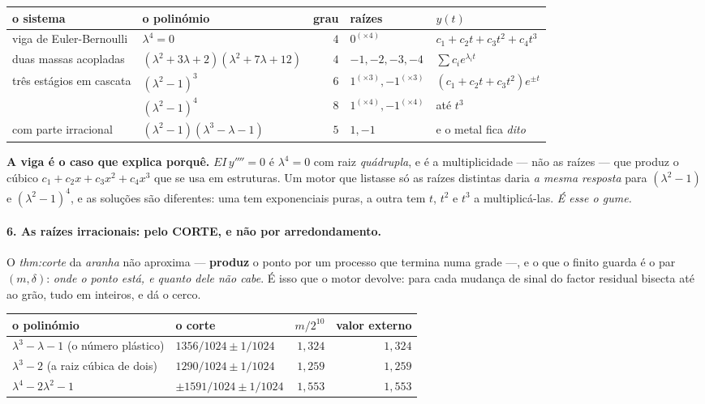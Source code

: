\documentclass[11pt,a4paper]{article}
\begin{document}
\begin{center}\footnotesize
\begin{tabular}{@{}llrll@{}}
\toprule
o sistema & o polinómio & grau & raízes & $y(t)$\\
\midrule
viga de Euler-Bernoulli & $\lambda^4=0$ & $4$ & $0^{(\times4)}$ & $c_1+c_2t+c_3t^2+c_4t^3$\\
duas massas acopladas & $(\lambda^2{+}3\lambda{+}2)(\lambda^2{+}7\lambda{+}12)$ & $4$ & $-1,-2,-3,-4$ & $\sum c_ie^{\lambda_it}$\\
três estágios em cascata & $(\lambda^2-1)^3$ & $6$ & $1^{(\times3)},-1^{(\times3)}$ & $(c_1{+}c_2t{+}c_3t^2)e^{\pm t}$\\
& $(\lambda^2-1)^4$ & $8$ & $1^{(\times4)},-1^{(\times4)}$ & até $t^3$\\
com parte irracional & $(\lambda^2-1)(\lambda^3-\lambda-1)$ & $5$ & $1,-1$ & e o metal fica \emph{dito}\\
\bottomrule
\end{tabular}
\end{center}

\noindent \textbf{A viga é o caso que explica porquê.} $EI\,y''''=0$ é $\lambda^4=0$ com raiz
\emph{quádrupla}, e é a multiplicidade --- não as raízes --- que produz o cúbico
$c_1+c_2x+c_3x^2+c_4x^3$ que se usa em estruturas. Um motor que listasse só as raízes
distintas daria \emph{a mesma resposta} para $(\lambda^2-1)$ e $(\lambda^2-1)^4$, e as
soluções são diferentes: uma tem exponenciais puras, a outra tem $t$, $t^2$ e $t^3$ a
multiplicá-las. \emph{É esse o gume.}

\paragraph{6. As raízes irracionais: pelo CORTE, e não por arredondamento.} O
\emph{thm:corte} da \emph{aranha} não aproxima --- \textbf{produz} o ponto por um processo
que termina numa grade ---, e o que o finito guarda é o par $(m,\delta)$: \emph{onde o ponto
está, e quanto dele não cabe}. É isso que o motor devolve: para cada mudança de sinal do
factor residual bisecta até ao grão, tudo em inteiros, e dá o cerco.

\begin{center}\footnotesize
\begin{tabular}{@{}llrr@{}}
\toprule
o polinómio & o corte & $m/2^{10}$ & valor externo\\
\midrule
$\lambda^3-\lambda-1$ (o número plástico) & $1356/1024\pm1/1024$ & $1{,}324$ & $1{,}324$\\
$\lambda^3-2$ (a raiz cúbica de dois) & $1290/1024\pm1/1024$ & $1{,}259$ & $1{,}259$\\
$\lambda^4-2\lambda^2-1$ & $\pm1591/1024\pm1/1024$ & $1{,}553$ & $1{,}553$\\
\bottomrule
\end{tabular}
\end{center}
\end{document}
